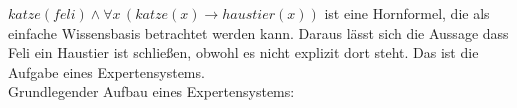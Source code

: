 \parskp
$katze(feli) \wedge \forall x \, (katze(x) \to haustier(x))$ ist eine Hornformel, die als einfache Wissensbasis betrachtet werden kann. Daraus lässt sich die Aussage dass Feli ein Haustier ist schließen, obwohl es nicht explizit dort steht. Das ist die Aufgabe eines Expertensystems.\\
Grundlegender Aufbau eines Expertensystems:
\begin{center}
\end{center}











